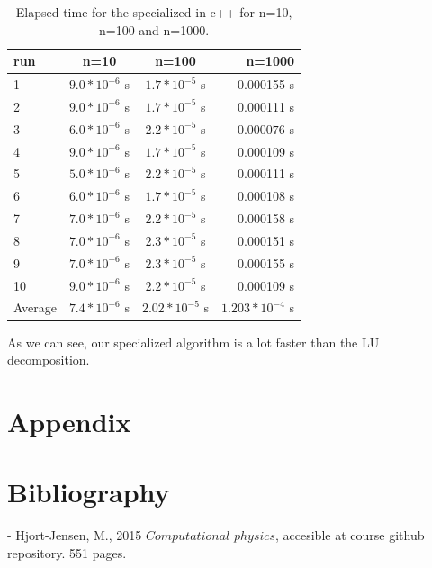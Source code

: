 \documentclass[%
oneside,                 %
final,                   %
10pt]{article}
\begin{document}
\begin{table}[H]
    \centering
    \begin{tabular}{|l|c|c|r|}
    \hline
     run & n=10 & n=100 & n=1000\\
     \hline
      1  & $9.0*10^{-6}$ s & $1.7*10^{-5}$ s & 0.000155 s\\
      2  & $9.0*10^{-6}$ s & $1.7*10^{-5}$ s & 0.000111 s\\
      3  & $6.0*10^{-6}$ s & $2.2*10^{-5}$ s & $0.000076$ s\\
      4  & $9.0*10^{-6}$ s& $1.7*10^{-5}$ s & 0.000109 s\\
      5  & $5.0*10^{-6}$ s& $2.2*10^{-5}$ s & 0.000111 s\\
      6  & $6.0*10^{-6}$ s& $1.7*10^{-5}$ s  & 0.000108 s\\
      7  & $7.0*10^{-6}$ s & $2.2*10^{-5}$ s & 0.000158 s\\
      8  & $7.0*10^{-6}$ s & $2.3*10^{-5}$ s & 0.000151 s\\
      9  & $7.0*10^{-6}$ s & $2.3*10^{-5}$ s  & 0.000155 s\\
      10 & $9.0*10^{-6}$ s & $2.2*10^{-5}$ s & 0.000109 s\\
      \hline 
      Average & $7.4*10^{-6}$ s & $2.02*10^{-5}$ s & $1.203*10^{-4}$ s\\
      \hline
    \end{tabular}
    \caption{Elapsed time for the specialized in c++ for n=10, n=100 and n=1000.}
    \label{tab:my_label}
\end{table}

As we can see, our specialized algorithm is a lot faster than the LU decomposition. 


\section{Appendix}

\section{Bibliography}

- Hjort-Jensen, M., 2015 $Computational$ $physics$, accesible at course github repository. 551 pages.
\end{document}
